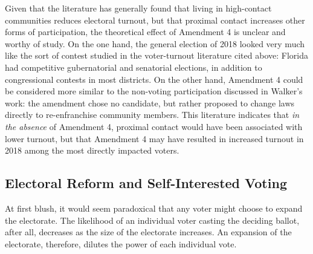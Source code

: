 \documentclass[
  12pt,
]{article}
\begin{document}
Given that the literature has generally found that living in high-contact communities reduces electoral turnout, but that proximal contact increases other forms of participation, the theoretical effect of Amendment 4 is unclear and worthy of study. On the one hand, the general election of 2018 looked very much like the sort of contest studied in the voter-turnout literature cited above: Florida had competitive gubernatorial and senatorial elections, in addition to congressional contests in most districts. On the other hand, Amendment 4 could be considered more similar to the non-voting participation discussed in Walker's work: the amendment chose no candidate, but rather proposed to change laws directly to re-enfranchise community members. This literature indicates that \emph{in the absence} of Amendment 4, proximal contact would have been associated with lower turnout, but that Amendment 4 may have resulted in increased turnout in 2018 among the most directly impacted voters.

\hypertarget{electoral-reform-and-self-interested-voting}{%
\subsection*{Electoral Reform and Self-Interested Voting}\label{electoral-reform-and-self-interested-voting}}

At first blush, it would seem paradoxical that any voter might choose to expand the electorate. The likelihood of an individual voter casting the deciding ballot, after all, decreases as the size of the electorate increases. An expansion of the electorate, therefore, dilutes the power of each individual vote.
\end{document}
